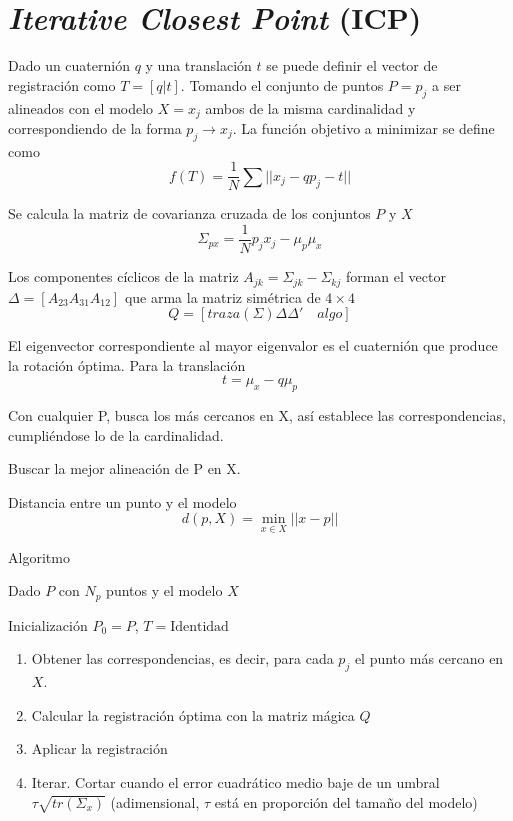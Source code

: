 \section{\emph{Iterative Closest Point} (ICP)}

Dado un cuaternión $q$ y una translación $t$
se puede definir el vector de registración como $T = [q|t]$.
Tomando el conjunto de puntos $P = {p_j}$ a ser alineados
con el modelo $X = {x_j}$ ambos de la misma cardinalidad
y correspondiendo de la forma $p_j \rightarrow x_j$.
La función objetivo a minimizar se define como
\[ f(T) = \frac{1}{N} \sum || x_j - q p_j - t || \]

Se calcula la matriz de covarianza cruzada de los conjuntos $P$ y $X$
\[ \Sigma_{px} = \frac{1}{N} p_j x_j - \mu_p \mu_x \]

Los componentes cíclicos  de la matriz $A_{jk} = \Sigma_{jk} - \Sigma_{kj}$
forman el vector $\Delta = [A_{23} A_{31} A_{12}]$
que arma la matriz simétrica de $4\times4$
\[
	Q = \left[
		traza(\Sigma) \Delta
		\Delta'   \quad  algo
		\right]
	\]

El eigenvector correspondiente al mayor eigenvalor es el cuaternión que produce la rotación óptima.
Para la translación
\[t = \mu_x - q \mu_p \]

Con cualquier P, busca los más cercanos en X, así establece las correspondencias,
cumpliéndose lo de la cardinalidad.

Buscar la mejor alineación de P en X.

Distancia entre un punto y el modelo
\[ d(p, X) = \min_{x \in X} ||x-p|| \]

Algoritmo

Dado $P$ con $N_p$ puntos y el modelo $X$

Inicialización $P_0 = P$, $T = \mbox{Identidad}$
\begin{enumerate}
	\item Obtener las correspondencias, es decir, para cada $p_j$ el punto más cercano en $X$.
	\item Calcular la registración óptima con la matriz mágica $Q$ 
	\item Aplicar la registración
	\item Iterar. Cortar cuando el error cuadrático medio baje de un umbral
		$\tau \sqrt{tr\left(\Sigma_x\right)}$ (adimensional, $\tau$ está en proporción del tamaño del modelo)
\end{enumerate}


